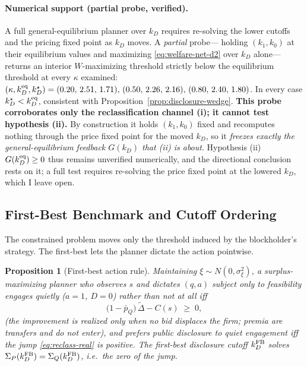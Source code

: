 \documentclass[11pt]{article}
\newtheorem{proposition}{Proposition}
\newcommand{\1}{\mathbf{1}}
\begin{document}
\paragraph{Numerical support (partial probe, verified).}
A full general-equilibrium planner over $k_D$ requires re-solving the lower
cutoffs and the pricing fixed point as $k_D$ moves. A \emph{partial} probe---%
holding $(k_1,k_0)$ at their equilibrium values and maximizing
\eqref{eq:welfare-net-d2} over $k_D$ alone---returns an interior $W$-maximizing
threshold strictly below the equilibrium threshold at every $\kappa$ examined:
$(\kappa,k_D^{\textup{eq}},k_D^{\star})=(0.20,\,2.51,\,1.71),\,
(0.50,\,2.26,\,2.16),\,(0.80,\,2.40,\,1.80)$.
In every case $k_D^{\star}<k_D^{\textup{eq}}$, consistent with
Proposition~\ref{prop:disclosure-wedge}. \textbf{This probe corroborates only the
reclassification channel (i); it cannot test hypothesis (ii).} By construction it
holds $(k_1,k_0)$ fixed and recomputes nothing through the price fixed point for
the moved $k_D$, so it \emph{freezes exactly the general-equilibrium feedback
$G(k_D)$ that (ii) is about}. Hypothesis (ii) $G(k_D^{\textup{eq}})\ge0$ thus
remains unverified numerically, and the directional conclusion rests on it; a full
test requires re-solving the price fixed point at the lowered $k_D$, which I leave
open.

\subsection{First-Best Benchmark and Cutoff Ordering}
\label{sec:welf-fb}

The constrained problem moves only the threshold induced by the blockholder's
strategy. The first-best lets the planner dictate the action pointwise.

\begin{proposition}[First-best action rule]
\label{prop:firstbest-d2}
Maintaining $\xi\sim N(0,\sigma_\xi^2)$, a surplus-maximizing planner who observes
$s$ and dictates $(q,a)$ subject only to feasibility engages quietly ($a=1$,
$D=0$) rather than not at all iff
\begin{equation}
\bigl(1-\bar p_Q\bigr)\,\tilde\Delta-C(s)\;\ge\;0,
\label{eq:fb-engage}
\end{equation}
(the improvement is realized only when no bid displaces the firm; premia are
transfers and do not enter), and prefers public disclosure to quiet engagement
iff the jump \eqref{eq:reclass-real} is positive. The first-best disclosure
cutoff $k_D^{\textup{FB}}$ solves
$\Sigma_P(k_D^{\textup{FB}})=\Sigma_Q(k_D^{\textup{FB}})$, i.e.\ the zero of the
jump.
\end{proposition}
\end{document}

